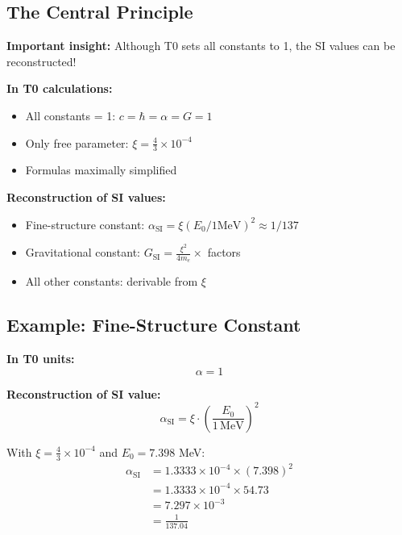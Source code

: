 	\subsection{The Central Principle}
	
	\textbf{Important insight:} Although T0 sets all constants to 1, the SI values can be reconstructed!
	
	\begin{tcolorbox}[colback=green!5!white,colframe=green!75!black,title=T0 Reconstruction]
		\textbf{In T0 calculations:}
		\begin{itemize}
			\item All constants = 1: $c = \hbar = \alpha = G = 1$
			\item Only free parameter: $\xi = \frac{4}{3} \times 10^{-4}$
			\item Formulas maximally simplified
		\end{itemize}
		
		\textbf{Reconstruction of SI values:}
		\begin{itemize}
			\item Fine-structure constant: $\alpha_{\text{SI}} = \xi(E_0/1\text{MeV})^2 \approx 1/137$
			\item Gravitational constant: $G_{\text{SI}} = \frac{\xi^2}{4m_e} \times$ factors
			\item All other constants: derivable from $\xi$
		\end{itemize}
	\end{tcolorbox}
	
	\subsection{Example: Fine-Structure Constant}
	
	\textbf{In T0 units:}
	\begin{equation}
		\alpha = 1
	\end{equation}
	
	\textbf{Reconstruction of SI value:}
	\begin{equation}
		\alpha_{\text{SI}} = \xi \cdot \left(\frac{E_0}{1\,\text{MeV}}\right)^2
	\end{equation}
	
	With $\xi = \frac{4}{3} \times 10^{-4}$ and $E_0 = 7.398$ MeV:
	\begin{align}
		\alpha_{\text{SI}} &= 1.3333 \times 10^{-4} \times (7.398)^2 \\
		&= 1.3333 \times 10^{-4} \times 54.73 \\
		&= 7.297 \times 10^{-3} \\
		&= \frac{1}{137.04}
	\end{align}
	

